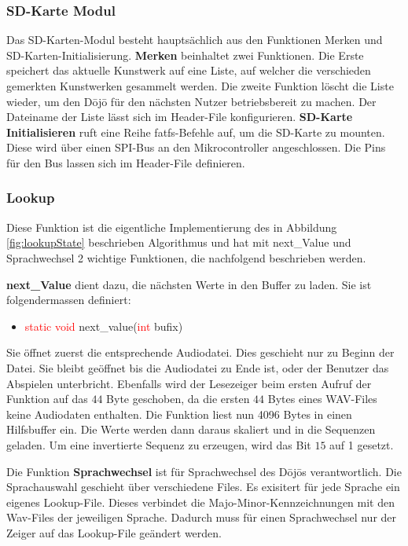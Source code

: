 \subsubsection{SD-Karte Modul}
Das SD-Karten-Modul besteht hauptsächlich aus den Funktionen Merken und SD-Karten-Initialisierung. \textbf{Merken} beinhaltet zwei Funktionen. Die Erste speichert das aktuelle Kunstwerk auf eine Liste, auf welcher die verschieden gemerkten Kunstwerken gesammelt werden. Die zweite Funktion löscht die Liste wieder, um den Dōjō für den nächsten Nutzer betriebsbereit zu machen. Der Dateiname der Liste lässt sich im Header-File konfigurieren. \textbf{SD-Karte Initialisieren} ruft eine Reihe fatfs-Befehle auf, um die SD-Karte zu mounten. Diese wird über einen SPI-Bus an den Mikrocontroller angeschlossen. Die Pins für den Bus lassen sich im Header-File definieren.

\subsubsection{Lookup}
Diese Funktion ist die eigentliche Implementierung des in Abbildung \ref{fig:lookupState} beschrieben Algorithmus und hat mit next\_Value und Sprachwechsel 2 wichtige Funktionen, die nachfolgend beschrieben werden.

\textbf{next\_Value} dient dazu, die nächsten Werte in den Buffer zu laden. Sie ist folgendermassen definiert:
\begin{itemize}
	\item [] \textcolor{red}{static void} next\_value(\textcolor{red}{int} bufix)
\end{itemize}
Sie öffnet zuerst die entsprechende Audiodatei. Dies geschieht nur zu Beginn der Datei. Sie bleibt geöffnet bis die Audiodatei zu Ende ist, oder der Benutzer das Abspielen unterbricht. Ebenfalls wird der Lesezeiger beim ersten Aufruf der Funktion auf das $44$ Byte geschoben, da die ersten $44$ Bytes eines WAV-Files keine Audiodaten enthalten. Die Funktion liest nun 4096 Bytes in einen Hilfsbuffer ein. Die Werte werden dann daraus skaliert und in die Sequenzen geladen. Um eine invertierte Sequenz zu erzeugen, wird das Bit $15$ auf 1 gesetzt.


Die Funktion \textbf{Sprachwechsel} ist für Sprachwechsel des Dōjōs verantwortlich. Die Sprachauswahl geschieht über verschiedene Files. Es exisitert für jede Sprache ein eigenes Lookup-File. Dieses verbindet die Majo-Minor-Kennzeichnungen mit den Wav-Files der jeweiligen Sprache. Dadurch muss für einen Sprachwechsel nur der Zeiger auf das Lookup-File geändert werden.

